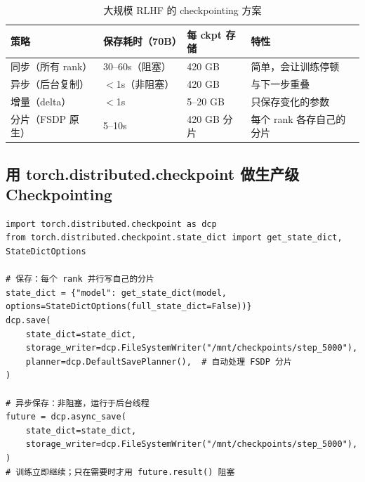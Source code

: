 \begin{table}[ht!]
\centering\small
\caption{大规模 RLHF 的 checkpointing 方案}
\begin{tabularx}{0.88\linewidth}{@{}l Z{0.93} Z{0.58} Z{1.49}@{}}
\toprule
\textbf{策略} & \textbf{保存耗时（70B）} & \textbf{每 ckpt 存储} & \textbf{特性} \\
\midrule
同步（所有 rank） & 30--60s（阻塞） & 420 GB & 简单，会让训练停顿 \\
异步（后台复制） & $<$1s（非阻塞） & 420 GB & 与下一步重叠 \\
增量（delta） & $<$1s & 5--20 GB & 只保存变化的参数 \\
分片（FSDP 原生） & 5--10s & 420 GB 分片 & 每个 rank 各存自己的分片 \\
\bottomrule
\end{tabularx}
\end{table}

\subsection{用 torch.distributed.checkpoint 做生产级 Checkpointing}
\label{production-checkpointing-with-torch.distributed.checkpoint}

\begin{lstlisting}[style=pythonstyle]
import torch.distributed.checkpoint as dcp
from torch.distributed.checkpoint.state_dict import get_state_dict, StateDictOptions

# 保存：每个 rank 并行写自己的分片
state_dict = {"model": get_state_dict(model, options=StateDictOptions(full_state_dict=False))}
dcp.save(
    state_dict=state_dict,
    storage_writer=dcp.FileSystemWriter("/mnt/checkpoints/step_5000"),
    planner=dcp.DefaultSavePlanner(),  # 自动处理 FSDP 分片
)

# 异步保存：非阻塞，运行于后台线程
future = dcp.async_save(
    state_dict=state_dict,
    storage_writer=dcp.FileSystemWriter("/mnt/checkpoints/step_5000"),
)
# 训练立即继续；只在需要时才用 future.result() 阻塞
\end{lstlisting}

